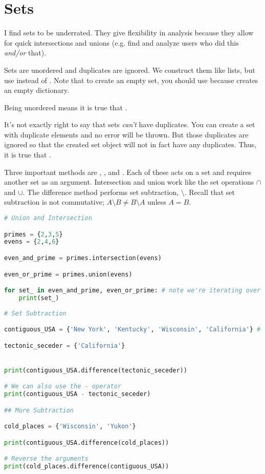 
\section{Sets}
\smallskip

I find sets to be underrated. They give flexibility in analysis because they allow for quick intersections and unions (e.g. find and analyze users who did this \emph{and/or} that).

\smallskip
\noindent Sets are unordered and duplicates are ignored. We construct them like lists, but use \code{\{\}} instead of \code{[]}. Note that to create an empty set, you should use  because \code{\{\}} creates an empty dictionary. 


\smallskip
\noindent Being unordered means it is true that .


\smallskip
\noindent It's not exactly right to say that sets \emph{can't} have duplicates. You can create a set with duplicate elements and no error will be thrown. But those duplicates are ignored so that the created set object will not in fact have any duplicates. Thus, it is true that .


\bigskip Three important methods are , , and . Each of these acts on a set and requires another set as an argument. Intersection and union work like the set operations $\cap$ and $\cup$. The difference method performs set subtraction, $\setminus$. Recall that set subtraction is not commutative; $A\setminus B \neq B\setminus A$ unless $A = B$. 

\begin{lstlisting}[language = Python]
# Union and Intersection

primes = {2,3,5}
evens = {2,4,6}

even_and_prime = primes.intersection(evens)

even_or_prime = primes.union(evens)

for set_ in even_and_prime, even_or_prime: # note we're iterating over a tuple
    print(set_)
    
# Set Subtraction

contiguous_USA = {'New York', 'Kentucky', 'Wisconsin', 'California'} # among other states

tectonic_seceder = {'California'}


print(contiguous_USA.difference(tectonic_seceder))

# We can also use the - operator
print(contiguous_USA - tectonic_seceder)

## More Subtraction 

cold_places = {'Wisconsin', 'Yukon'}

print(contiguous_USA.difference(cold_places))

# Reverse the arguments
print(cold_places.difference(contiguous_USA))
\end{lstlisting}



